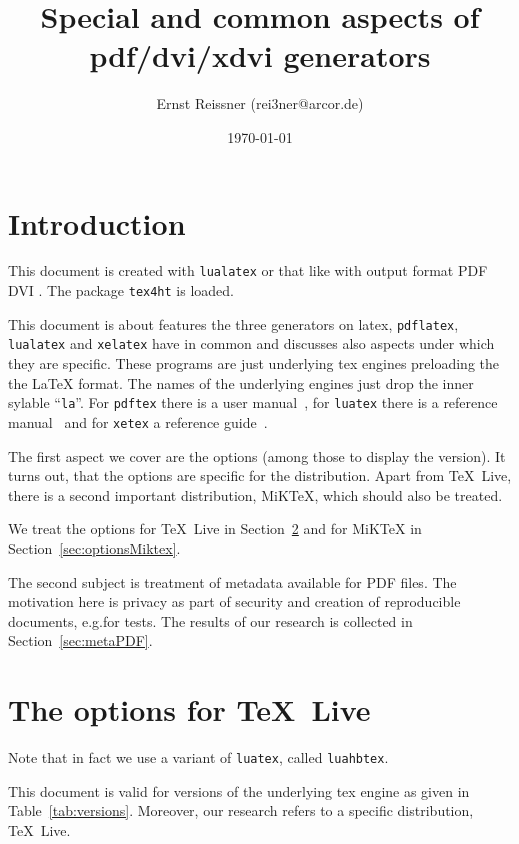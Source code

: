 \documentclass[a4paper]{article}%
\title{Special and common aspects of pdf/dvi/xdvi generators }
\author{Ernst Reissner (rei3ner@arcor.de)}
\date{\today}
\newcommand{\pdflatex}{\texttt{pdflatex}}
\newcommand{\lualatex}{\texttt{lualatex}}
\newcommand{\xelatex}{\texttt{xelatex}}
\newcommand{\texlive}{\TeX~Live}
\newcommand{\miktex}{MiKTeX}
\begin{document}
\maketitle
\tableofcontents
\listoftables

\section{Introduction}

This document is created with \lualatex{} or that like 
with output format 
\ifpdf%
PDF%
\else
DVI%
\fi.
The package \texttt{tex4ht} 
is  loaded. 

This document is about features the three generators on latex, 
\pdflatex, \lualatex{} and \xelatex{} have in common 
and discusses also aspects under which they are specific. 
These programs are just underlying tex engines preloading the the \LaTeX{} format. 
The names of the underlying engines just drop the inner sylable ``\texttt{la}''. 
For \texttt{pdftex} there is a user manual~\cite{PdfTexUsr}, 
for \texttt{luatex} there is a reference manual~\cite{LuaTexRef} and 
for \texttt{xetex} a reference guide~\cite{XeTexRef}. 

The first aspect we cover are the options (among those to display the version). 
It turns out, that the options are specific for the distribution. 
Apart from \texlive{}, there is a second important distribution, \miktex, 
which should also be treated. 

We treat the options for \texlive{} in Section~\ref{sec:optionsTexlive} 
and for \miktex{} in Section~\ref{sec:optionsMiktex}. 

The second subject is treatment of metadata available for PDF files. 
The motivation here is privacy as part of security 
and creation of reproducible documents, e.g.\@ for tests. 
The results of our research is collected in Section~\ref{sec:metaPDF}. 

\section{The options for \texlive}\label{sec:optionsTexlive}


Note that in fact we use a variant of \texttt{luatex}, called \texttt{luahbtex}. 

This document is valid for versions of the underlying tex engine 
as given in Table~\ref{tab:versions}. 
Moreover, our research refers to a specific distribution, \texlive. 
\end{document}
